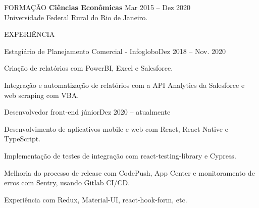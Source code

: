 \documentclass{resume}
\begin{document}

\begin{rSection}{FORMAÇÃO}
  {\bf Ciências Econômicas} \hfill {Mar 2015 -- Dez  2020}
  \\
  Universidade Federal Rural do Rio de Janeiro.
  \\
\end{rSection}


\begin{rSection}{EXPERIÊNCIA}
  \begin{rSubsection}{Estagiário de Planejamento Comercial - Infoglobo}{Dez 2018
    -- Nov. 2020}{}
  \item
  \item Criação de relatórios com PowerBI, Excel e Salesforce.
  \item Integração e automatização de relatórios com a API Analytics da
    Salesforce e web scraping com VBA.
  \vspace{5mm}
  \end{rSubsection}

  \begin{rSubsection}{Desenvolvedor front-end júnior}{Dez 2020 -- atualmente}{}
  \item
  \item Desenvolvimento de aplicativos mobile e web com React, React Native e
    TypeScript.
  \item Implementação de testes de integração com react-testing-library e
    Cypress.
  \item Melhoria do processo de release com CodePush, App Center e monitoramento
    de erros com Sentry, usando Gitlab CI/CD.
  \item Experiência com Redux, Material-UI, react-hook-form, etc.
  \vspace{5mm}
  \end{rSubsection}
\end{rSection}

\end{document}
